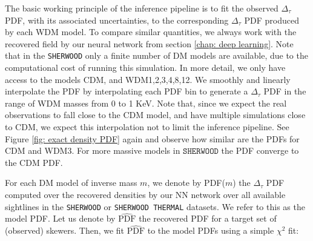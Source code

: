 The basic working principle of the inference pipeline is to fit the observed $\Delta_\tau$ PDF, with its associated uncertainties, to the corresponding $\Delta_\tau$ PDF produced by each WDM model. To compare similar quantities, we always work with the recovered field by our neural network from section \ref{chap: deep learning}. Note that in the \texttt{SHERWOOD} only a finite number of DM models are available, due to the computational cost of running this simulation. In more detail, we only have access to the models CDM, and WDM1,2,3,4,8,12. We smoothly and linearly interpolate the PDF by interpolating each PDF bin to generate a $\Delta_\tau$ PDF in the range of WDM masses from 0 to 1 KeV. Note that, since we expect the real observations to fall close to the CDM model, and have multiple simulations close to CDM, we expect this interpolation not to limit the inference pipeline. See Figure \ref{fig: exact density PDF} again and observe how similar are the PDFs for CDM and WDM3. For more massive models in $\texttt{SHERWOOD}$ the PDF converge to the CDM PDF.

For each DM model of inverse mass $m$, we denote by PDF($m$)  the $\Delta_\tau$ PDF computed over the recovered densities by our NN network over all available sightlines in the \texttt{SHERWOOD} or \texttt{SHERWOOD THERMAL} datasets. We refer to this as the model PDF. Let us denote by $\widehat{\text{PDF}}$ the recovered PDF for a target set of (observed) skewers. Then, we fit $\hat{\text{PDF}}$ to the model PDFs using a simple $\chi^2$ fit:

